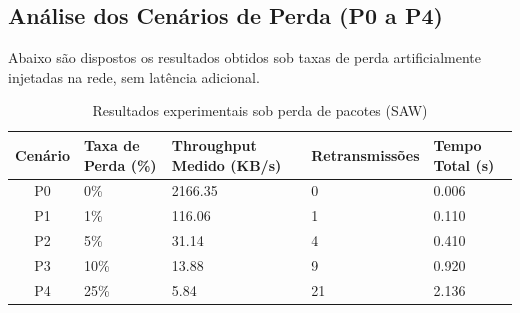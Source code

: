 \documentclass[12pt,a4paper]{article}
\begin{document}
\subsection{Análise dos Cenários de Perda (P0 a P4)}
Abaixo são dispostos os resultados obtidos sob taxas de perda artificialmente injetadas na rede, sem latência adicional.

\begin{table}[H]
    \centering
    \caption{Resultados experimentais sob perda de pacotes (SAW)}
    \begin{tabularx}{\textwidth}{c*{4}{Y}}
        \toprule
        \textbf{Cenário} & \textbf{Taxa de Perda (\%)} & \textbf{Throughput Medido (KB/s)} & \textbf{Retransmissões} & \textbf{Tempo Total (s)} \\
        \midrule
        P0 & 0\%   & 2166.35 & 0  & 0.006 \\
        P1 & 1\%   & 116.06  & 1  & 0.110 \\
        P2 & 5\%   & 31.14   & 4  & 0.410 \\
        P3 & 10\%  & 13.88   & 9  & 0.920 \\
        P4 & 25\%  & 5.84    & 21 & 2.136 \\
        \bottomrule
    \end{tabularx}
    \label{tab:saw_perda}
\end{table}
\end{document}
